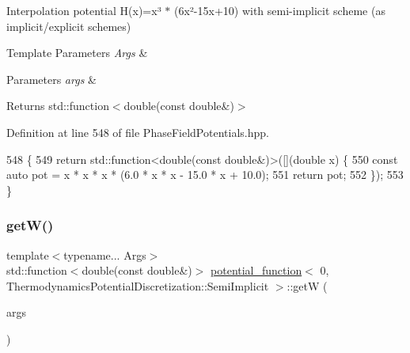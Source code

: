 Interpolation potential H(x)=x³ $\ast$ (6x²-\/15x+10) with semi-\/implicit scheme (as implicit/explicit schemes) 


\begin{DoxyTemplParams}{Template Parameters}
{\em Args} & \\
\hline
\end{DoxyTemplParams}

\begin{DoxyParams}{Parameters}
{\em args} & \\
\hline
\end{DoxyParams}
\begin{DoxyReturn}{Returns}
std\+::function$<$double(const double\&)$>$ 
\end{DoxyReturn}


Definition at line 548 of file Phase\+Field\+Potentials.\+hpp.


\begin{DoxyCode}
548                                                         \{
549     \textcolor{keywordflow}{return} std::function<double(const double&)>([](\textcolor{keywordtype}{double} x) \{
550       \textcolor{keyword}{const} \textcolor{keyword}{auto} pot = x * x * x * (6.0 * x * x - 15.0 * x + 10.0);
551       \textcolor{keywordflow}{return} pot;
552     \});
553   \}
\end{DoxyCode}
\mbox{\label{structpotential__function_3_010_00_01ThermodynamicsPotentialDiscretization_1_1SemiImplicit_01_4_afb01c48fefb8549b46f1df57dee9e19e}} 
\subsubsection{\texorpdfstring{get\+W()}{getW()}}
{\footnotesize\ttfamily template$<$typename... Args$>$ \\
std\+::function$<$double(const double\&)$>$ \hyperlink{structpotential__function}{potential\+\_\+function}$<$ 0, Thermodynamics\+Potential\+Discretization\+::\+Semi\+Implicit $>$\+::getW (\begin{DoxyParamCaption}\item[{Args...}]{args }\end{DoxyParamCaption})\hspace{0.3cm}{\ttfamily [inline]}}



